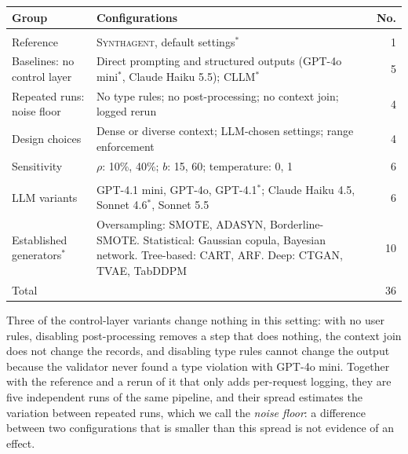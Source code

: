 \documentclass[conference]{IEEEtran}
\newcommand{\system}{\textsc{Synthagent}\xspace}
\providecommand{\DIFaddbeginFL}{} %
\providecommand{\DIFaddendFL}{} %
\providecommand{\DIFdelendFL}{} %
\newcommand{\DIFaddincludegraphics}[2][]{{\color{blue}\fbox{\DIFOincludegraphics[#1]{#2}}}} %
\DeclareRobustCommand{\DIFaddbeginFL}{\DIFOaddbeginFL \let\includegraphics\DIFaddincludegraphics} %
\DeclareRobustCommand{\DIFaddendFL}{\DIFOaddendFL \let\includegraphics\DIFOincludegraphics} %
\DeclareRobustCommand{\DIFdelendFL}{\DIFOaddendFL \let\includegraphics\DIFOincludegraphics} %
\begin{document}
\begin{table}[t]
\DIFdelendFL \DIFaddbeginFL \setlength{\tabcolsep}{3pt}
\renewcommand{\arraystretch}{1.15}
\begin{tabular}{@{}>{\raggedright\arraybackslash}p{}>{\raggedright\arraybackslash}p{}r@{}}
\toprule
Group & Configurations & No. \\
\midrule
\multicolumn{3}{@{}l}{\textit{Control layer (RQ1)}}\\
Reference & \system, default settings$^{\ast}$ & 1 \\
Baselines: no control layer & Direct prompting and structured outputs (GPT-4o mini$^{\ast}$, Claude Haiku 5.5); CLLM$^{\ast}$ & 5 \\
Repeated runs: noise floor & No type rules; no post-processing; no context join; logged rerun & 4 \\
Design choices & Dense or diverse context; LLM-chosen settings; range enforcement & 4 \\
Sensitivity & $\rho$: 10\%, 40\%; $b$: 15, 60; temperature: 0, 1 & 6 \\
\midrule
\multicolumn{3}{@{}l}{\textit{Comparison (RQ4)}}\\
LLM variants & GPT-4.1 mini, GPT-4o, GPT-4.1$^{\ast}$; Claude Haiku 4.5, Sonnet 4.6$^{\ast}$, Sonnet 5.5 & 6 \\
Established generators$^{\ast}$ & Oversampling: SMOTE, ADASYN, Borderline-SMOTE. Statistical: Gaussian copula, Bayesian network. Tree-based: CART, ARF. Deep: CTGAN, TVAE, TabDDPM & 10 \\
\midrule
Total & & 36 \\
\bottomrule
\end{tabular}
\DIFaddendFL \end{table}

Three of the control-layer variants change nothing in this setting: with no user rules, disabling post-processing removes a step that does nothing, the context join does not change the records, and disabling type rules cannot change the output because the validator never found a type violation with GPT-4o mini. Together with the reference and a rerun of it that only adds per-request logging, they are five independent runs of the same pipeline, and their spread estimates the variation between repeated runs, which we call the \emph{noise floor}: a difference between two configurations that is smaller than this spread is not evidence of an effect.
\end{document}
